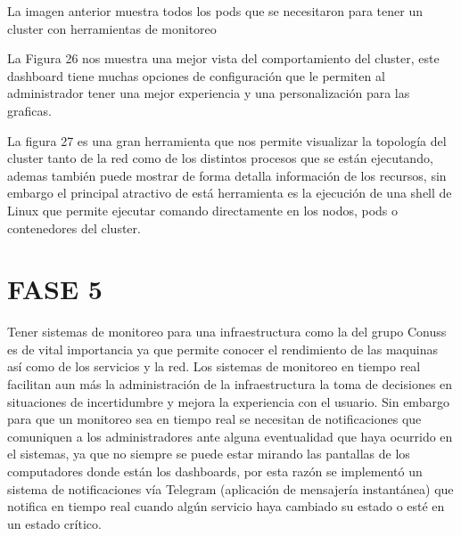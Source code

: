       
     La imagen anterior muestra todos los pods que se necesitaron para tener un cluster con herramientas de monitoreo 
     
      
      
      
      
      
      
      La Figura 26 nos muestra una mejor vista del comportamiento del cluster, este dashboard tiene muchas opciones de configuración que le permiten al administrador tener una mejor experiencia y una personalización para las graficas.
      
      La figura 27 es una gran herramienta que nos permite visualizar la topología del cluster tanto de la red como de los distintos procesos que se están ejecutando, ademas también puede mostrar de forma detalla información de los recursos, sin embargo el principal atractivo de está herramienta es la ejecución de una shell de Linux que permite ejecutar comando directamente en los nodos, pods o contenedores del cluster.
      
      
      	
      
     
      
      
      
      
    
  

    

    
    
    

    
    
    
   
        
    \section{FASE 5}
    Tener sistemas de monitoreo para una infraestructura como la del grupo Conuss es de vital importancia ya que permite conocer el rendimiento de las maquinas así como de los servicios y la red. Los sistemas de monitoreo en tiempo real facilitan aun más la administración de la infraestructura la toma de decisiones en situaciones de incertidumbre y mejora la experiencia con el usuario. Sin embargo para que un monitoreo sea en tiempo real se necesitan de notificaciones que comuniquen a los administradores ante alguna eventualidad que haya ocurrido en el sistemas, ya que no siempre se puede estar mirando las pantallas de los computadores donde están los dashboards, por esta razón se implementó un sistema de notificaciones vía Telegram (aplicación de mensajería instantánea) que notifica en tiempo real cuando algún servicio haya cambiado su estado o esté en un estado crítico. 
    
